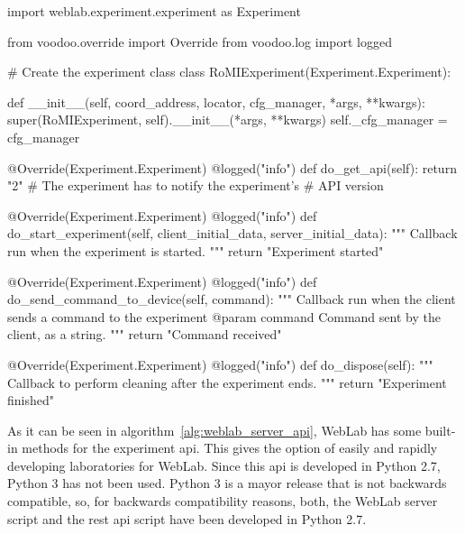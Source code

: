 \clearpage
\begin{center}
\begin{minipage}{.9\textwidth}
\singlespace
{}
\begin{pyglist}[language=python, caption={WebLab experiment server development.},
	label={alg:weblab_server_api}, listingname={Algorithm}, numbers=left]
import weblab.experiment.experiment as Experiment

from voodoo.override import Override
from voodoo.log import logged

# Create the experiment class
class RoMIExperiment(Experiment.Experiment):

    def __init__(self, coord_address, locator, cfg_manager,
    *args, **kwargs):
        super(RoMIExperiment, self).__init__(*args, **kwargs)
        self._cfg_manager = cfg_manager

    @Override(Experiment.Experiment)
    @logged("info")
    def do_get_api(self):
        return "2" # The experiment has to notify the experiment's
                   # API version

    @Override(Experiment.Experiment)
    @logged("info")
    def do_start_experiment(self, client_initial_data,
    server_initial_data):
        """
        Callback run when the experiment is started.
        """
        return "Experiment started"

    @Override(Experiment.Experiment)
    @logged("info")
    def do_send_command_to_device(self, command):
        """
        Callback run when the client sends a command to the experiment
        @param command Command sent by the client, as a string.
        """
        return "Command received"

    @Override(Experiment.Experiment)
    @logged("info")
    def do_dispose(self):
        """
        Callback to perform cleaning after the experiment ends.
        """
        return "Experiment finished"
\end{pyglist}
\end{minipage}
\end{center}
\clearpage

As it can be seen in algorithm~\ref{alg:weblab_server_api}, WebLab has some built-in methods for the
experiment \acrshort{api}. This gives the option of easily and rapidly developing laboratories for
WebLab. Since this \acrshort{api} is developed in Python 2.7, Python 3 has not been used. Python 3
is a mayor release that is not backwards compatible, so, for backwards compatibility reasons, both,
the WebLab server script and the \acrshort{rest} \acrshort{api} script have been developed in Python
2.7.

